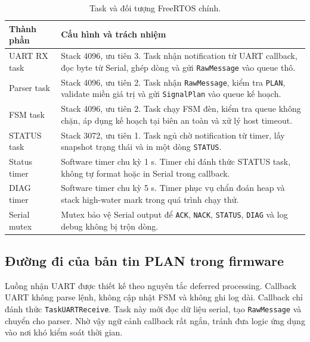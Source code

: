 \begin{table}[H]
\centering
\caption{Task và đối tượng FreeRTOS chính.}
\label{tab:freertos-tasks}
\small
\setlength{\tabcolsep}{4pt}
\renewcommand{\arraystretch}{1.18}
\begin{tabularx}{\linewidth}{R{3.1cm}Y}
\toprule
\textbf{Thành phần} & \textbf{Cấu hình và trách nhiệm} \\
\midrule
UART RX task & Stack 4096, ưu tiên 3. Task nhận notification từ UART callback, đọc byte từ Serial, ghép dòng và gửi \texttt{RawMessage} vào queue thô. \\
Parser task & Stack 4096, ưu tiên 2. Task nhận \texttt{RawMessage}, kiểm tra \texttt{PLAN}, validate miền giá trị và gửi \texttt{SignalPlan} vào queue kế hoạch. \\
FSM task & Stack 4096, ưu tiên 2. Task chạy FSM đèn, kiểm tra queue không chặn, áp dụng kế hoạch tại biên an toàn và xử lý host timeout. \\
STATUS task & Stack 3072, ưu tiên 1. Task ngủ chờ notification từ timer, lấy snapshot trạng thái và in một dòng \texttt{STATUS}. \\
Status timer & Software timer chu kỳ 1 s. Timer chỉ đánh thức STATUS task, không tự format hoặc in Serial trong callback. \\
DIAG timer & Software timer chu kỳ 5 s. Timer phục vụ chẩn đoán heap và stack high-water mark trong quá trình chạy thử. \\
Serial mutex & Mutex bảo vệ Serial output để \texttt{ACK}, \texttt{NACK}, \texttt{STATUS}, \texttt{DIAG} và log debug không bị trộn dòng. \\
\bottomrule
\end{tabularx}
\normalsize
\end{table}

\subsection{Đường đi của bản tin PLAN trong firmware}

Luồng nhận UART được thiết kế theo nguyên tắc deferred processing. Callback UART không parse lệnh, không cập nhật FSM và không ghi log dài. Callback chỉ đánh thức \texttt{TaskUARTReceive}. Task này mới đọc dữ liệu serial, tạo \texttt{RawMessage} và chuyển cho parser. Nhờ vậy ngữ cảnh callback rất ngắn, tránh đưa logic ứng dụng vào nơi khó kiểm soát thời gian.


